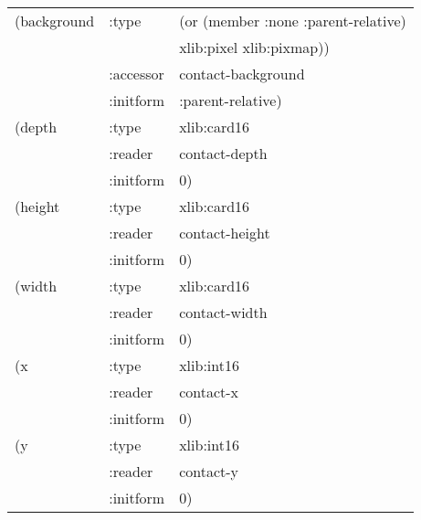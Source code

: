 \begin{flushright}
{\begin{tabular}{lll}
   (background & :type & (or (member :none :parent-relative) \\
                       &       & xlib:pixel xlib:pixmap)) \\
&                        :accessor & contact-background \\
&                        :initform & :parent-relative) \\
   (depth &              :type & xlib:card16 \\
&                        :reader & contact-depth \\
&                        :initform & 0) \\
   (height &             :type & xlib:card16 \\
&                        :reader & contact-height \\
&                        :initform & 0) \\
   (width &              :type & xlib:card16 \\
&                        :reader & contact-width \\
&                        :initform & 0) \\
   (x &                  :type & xlib:int16 \\
&                        :reader & contact-x \\
&                        :initform & 0) \\
   (y &                  :type & xlib:int16 \\
&                        :reader & contact-y \\
&                        :initform & 0)  
\end{tabular}}


\end{flushright}
